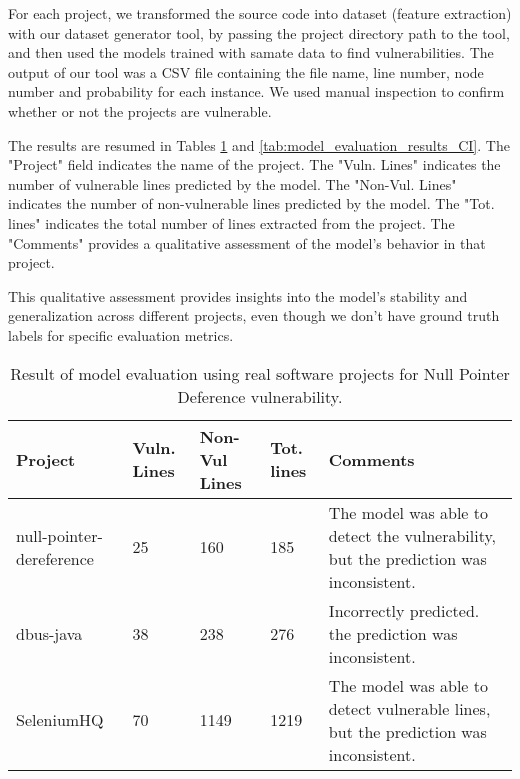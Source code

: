 For each project, we transformed the source code into dataset (feature extraction) with our dataset generator tool, by passing the project directory path to the tool, and then used the models trained with \gls{samate} data to find vulnerabilities. The output of our tool was a CSV file containing the file name, line number, node number and probability for each instance. We used manual inspection to confirm whether or not the projects are vulnerable. 

The results are resumed in Tables \ref{tab:model_evaluation_results_NPD} and \ref{tab:model_evaluation_results_CI}. The "Project" field indicates the name of the project. The "Vuln. Lines" indicates the number of vulnerable lines predicted by the model. The "Non-Vul. Lines" indicates the number of non-vulnerable lines predicted by the model. The "Tot. lines" indicates the total number of lines extracted from the project. The "Comments" provides a qualitative assessment of the model's behavior in that project. 

This qualitative assessment provides insights into the model's stability and generalization across different projects, even though we don't have ground truth labels for specific evaluation metrics.

\begin{table}[!ht]
    \centering
    \caption{Result of model evaluation  using real software projects for Null Pointer Deference vulnerability.}
    \begin{tabular}{|p{1.5in}|p{0.5in}|p{0.5in}|p{0.5in}|p{3in}|}
    \hline
        \textbf{Project} & \textbf{Vuln. Lines} & \textbf{Non-Vul Lines} & \textbf{Tot. lines } & \textbf{Comments} \\ \hline
        null-pointer-dereference & 25 & 160 & 185 & The model was able to detect the vulnerability, but the prediction was inconsistent. \\ \hline
        dbus-java & 38 & 238 & 276 & Incorrectly predicted. the prediction was inconsistent. \\ \hline
        SeleniumHQ & 70 & 1149 & 1219 & The model was able to detect vulnerable lines, but the prediction was inconsistent. \\ \hline
    \end{tabular}
	\label{tab:model_evaluation_results_NPD}
\end{table}

\newpage

